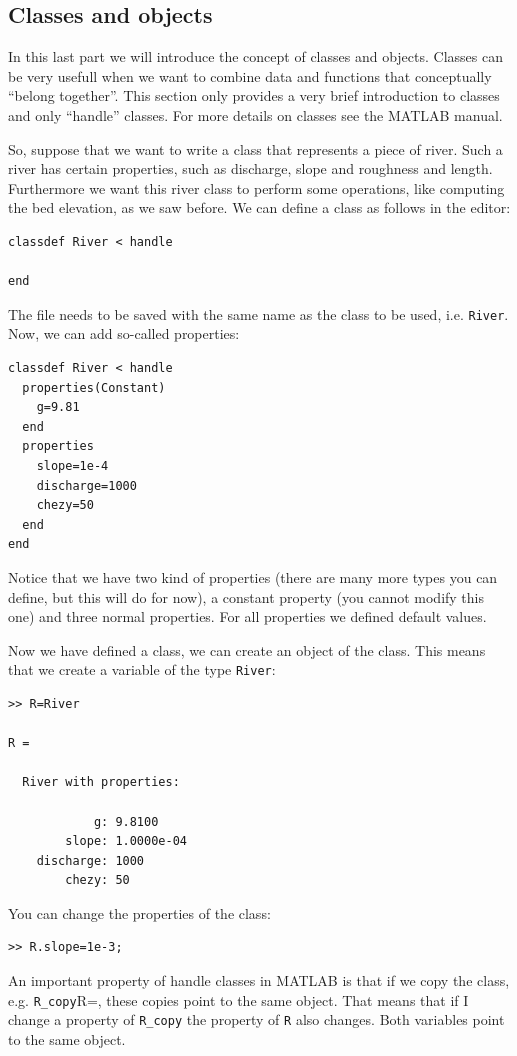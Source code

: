 \documentclass[a4paper]{article}
\begin{document}
\subsection{Classes and objects}
In this last part we will introduce the concept of classes and objects. Classes can be very usefull when we want to combine data and functions that conceptually ``belong together''. This section only provides a very brief introduction to classes and only ``handle'' classes. For more details on classes see the MATLAB manual.

So, suppose that we want to write a class that represents a piece of river. Such a river has certain properties, such as discharge, slope and roughness and length. Furthermore we want this river class to perform some operations, like computing the bed elevation, as we saw before. We can define a class as follows in the editor:
\begin{lstlisting}
classdef River < handle

end
\end{lstlisting}
The file needs to be saved with the same name as the class to be used, i.e. \lstinline{River}. Now, we can add so-called properties:
\begin{lstlisting}
classdef River < handle
  properties(Constant)
    g=9.81
  end
  properties
    slope=1e-4
    discharge=1000
    chezy=50
  end
end
\end{lstlisting}
Notice that we have two kind of properties (there are many more types you can define, but this will do for now), a constant property (you cannot modify this one) and three normal properties. For all properties we defined default values.

Now we have defined a class, we can create an object of the class. This means that we create a variable of the type \lstinline=River=:
\begin{lstlisting}
>> R=River

R =

  River with properties:

            g: 9.8100
        slope: 1.0000e-04
    discharge: 1000
        chezy: 50

\end{lstlisting}
You can change the properties of the class:
\begin{lstlisting}
>> R.slope=1e-3;
\end{lstlisting}
An important property of handle classes in MATLAB is that if we copy the class, e.g. \lstinline=R_copy=R=, these copies point to the same object. That means that if I change a property of \lstinline=R_copy= the property of \lstinline=R= also changes. Both variables point to the same object.
\end{document}
